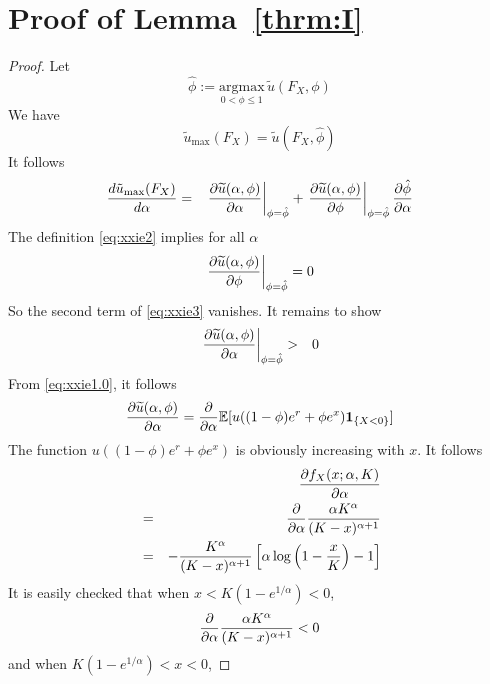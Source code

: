 \documentclass[11pt,a4]{amsart}
\newcommand{\pd}{\partial}
\newcommand{\wt}{\widetilde}
\newcommand{\E }{{\mathbb E}}
\newcommand{\1}{{\mathbf 1}}
\begin{document}
\section{Proof of Lemma~\ref{thrm:I}}
\setcounter{equation}{0}
\label{sec:thrmI_proof}
\begin{proof}
  Let
  \begin{equation}
    \label{eq:xxie2}
    \hat \phi := \underset{0 < \phi \leq 1}{\text{argmax}}\,
    \wt u(F_X, \phi)
  \end{equation}
  We have
  \[
  \tilde u_{\text{max}}(F_X) = \wt u(F_X, \hat\phi)
  \]
  It follows
  \begin{eqnarray}
    {d \tilde u_{\text{max}}(F_X) \over d \alpha}
    &=&
    \left.{\pd \wt u(\alpha, \phi) \over \pd \alpha}\right|_{\phi = \hat\phi}
    + \left.{\pd \wt u(\alpha, \phi) \over \pd \phi}\right|_{\phi = \hat\phi}
    {\pd \hat\phi \over \pd \alpha}
    \label{eq:xxie3}
  \end{eqnarray}
  The definition \eqref{eq:xxie2} implies for all $\alpha$
  \begin{equation}
    \label{eq:xxie4}
    \left.{\pd \wt u(\alpha, \phi) \over \pd \phi}\right|_{\phi = \hat\phi} = 0
  \end{equation}
  So the second term of \eqref{eq:xxie3} vanishes. It remains to show
  \begin{eqnarray*}
    \left.{
        \pd \wt u(\alpha, \phi) \over \pd \alpha}
    \right|_{\phi = \hat\phi} &>& 0
  \end{eqnarray*}
  From \eqref{eq:xxie1.0}, it follows
  \begin{eqnarray*}
    {\pd \wt u(\alpha, \phi) \over \pd \alpha}
    = {\partial \over \partial \alpha}\E[u((1 - \phi) e^r + \phi e^x) \1_{\{X < 0\}}]
  \end{eqnarray*}
  The function $u((1 - \phi) e^r + \phi e^x)$ is obviously
  increasing with $x$. It follows
  \begin{eqnarray*}
    && {\pd f_X(x; \alpha, K) \over \pd \alpha} \\
    &=& {\partial \over \partial \alpha} {\alpha K^\alpha \over (K - x)^{\alpha + 1}} \\
    &=&
    - {K^\alpha \over (K - x)^{\alpha + 1}}
    \left[
      \alpha
      \log\left(
        1 - {x \over K}
      \right) - 1
    \right]
  \end{eqnarray*}
  It is easily checked that when $x < K(1 - e^{1/\alpha}) < 0$,
  \[
  {\partial \over \partial \alpha} {\alpha K^\alpha \over (K - x)^{\alpha + 1}} < 0
  \]
  and when $K(1 - e^{1/\alpha}) < x < 0$,

\end{proof}
\end{document}
